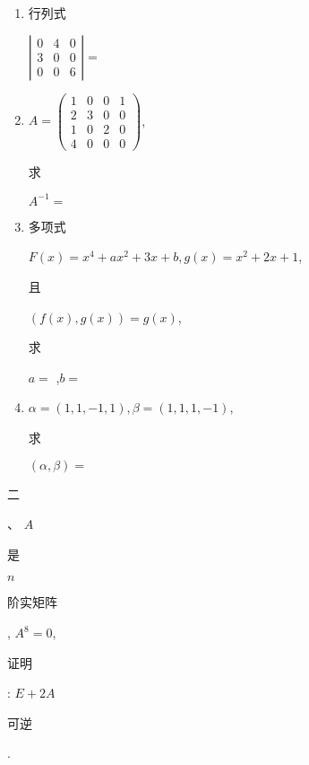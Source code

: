 \documentclass[10pt]{article}
\begin{document}
\begin{enumerate}
  \item \begin{CJK}{UTF8}{mj}行列式\end{CJK} $\left|\begin{array}{lll}0 & 4 & 0 \\ 3 & 0 & 0 \\ 0 & 0 & 6\end{array}\right|=$

  \item $A=\left(\begin{array}{llll}1 & 0 & 0 & 1 \\ 2 & 3 & 0 & 0 \\ 1 & 0 & 2 & 0 \\ 4 & 0 & 0 & 0\end{array}\right)$, \begin{CJK}{UTF8}{mj}求\end{CJK} $A^{-1}=$

  \item \begin{CJK}{UTF8}{mj}多项式\end{CJK} $F(x)=x^{4}+a x^{2}+3 x+b, g(x)=x^{2}+2 x+1$, \begin{CJK}{UTF8}{mj}且\end{CJK} $(f(x), g(x))=g(x)$, \begin{CJK}{UTF8}{mj}求\end{CJK} $a=$ ,$b=$

  \item $\alpha=(1,1,-1,1), \beta=(1,1,1,-1)$, \begin{CJK}{UTF8}{mj}求\end{CJK} $(\alpha, \beta)=$

\end{enumerate}
\begin{CJK}{UTF8}{mj}二\end{CJK}、 $A$ \begin{CJK}{UTF8}{mj}是\end{CJK} $n$ \begin{CJK}{UTF8}{mj}阶实矩阵\end{CJK}, $A^{8}=0$, \begin{CJK}{UTF8}{mj}证明\end{CJK}: $E+2 A$ \begin{CJK}{UTF8}{mj}可逆\end{CJK}.
\end{document}

